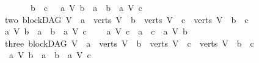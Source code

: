 \begin{isabellebody}
\ \ \ \ \ \ \ \ \ b\ {\isasymnoteq}\ c\ \ {\isasymand}\ {\isacharparenleft}{\kern0pt}{\isacharparenleft}{\kern0pt}{\isacharparenleft}{\kern0pt}a\ {\isasymrightarrow}\isactrlsup {\isacharplus}{\kern0pt}\isactrlbsub V\isactrlesub \ b{\isacharparenright}{\kern0pt}\ {\isasymor}\ a\ {\isacharequal}{\kern0pt}\ b{\isacharparenright}{\kern0pt}\ {\isasymand}\ {\isasymnot}{\isacharparenleft}{\kern0pt}a\ {\isasymrightarrow}\isactrlsup {\isacharplus}{\kern0pt}\isactrlbsub V\isactrlesub \ c{\isacharparenright}{\kern0pt}{\isacharparenright}{\kern0pt}{\isachardoublequoteclose}\ \isanewline
\ \ {\isacharbar}{\kern0pt}\ {\isacharparenleft}{\kern0pt}two{\isacharparenright}{\kern0pt}\ {\isachardoublequoteopen}{\isacharparenleft}{\kern0pt}blockDAG\ V\ {\isasymand}\ a\ {\isasymin}\ verts\ V\ {\isasymand}\ b\ {\isasymin}\ verts\ V\ {\isasymand}\ c\ {\isasymin}\ verts\ V{\isacharparenright}{\kern0pt}\ {\isasymand}\ b\ {\isasymnoteq}\ c\ \isanewline
\ \ {\isasymand}\ {\isasymnot}{\isacharparenleft}{\kern0pt}{\isacharparenleft}{\kern0pt}{\isacharparenleft}{\kern0pt}a\ {\isasymrightarrow}\isactrlsup {\isacharplus}{\kern0pt}\isactrlbsub V\isactrlesub \ b{\isacharparenright}{\kern0pt}\ {\isasymor}\ a\ {\isacharequal}{\kern0pt}\ b{\isacharparenright}{\kern0pt}\ {\isasymand}\ {\isasymnot}{\isacharparenleft}{\kern0pt}a\ {\isasymrightarrow}\isactrlsup {\isacharplus}{\kern0pt}\isactrlbsub V\isactrlesub \ c{\isacharparenright}{\kern0pt}{\isacharparenright}{\kern0pt}\ {\isasymand}\ \isanewline
\ \ {\isacharparenleft}{\kern0pt}{\isacharparenleft}{\kern0pt}a\ {\isasymrightarrow}\isactrlsup {\isacharplus}{\kern0pt}\isactrlbsub V\isactrlesub \ c{\isacharparenright}{\kern0pt}\ {\isasymor}\ a\ {\isacharequal}{\kern0pt}\ c{\isacharparenright}{\kern0pt}\ {\isasymand}\ {\isasymnot}{\isacharparenleft}{\kern0pt}a\ {\isasymrightarrow}\isactrlsup {\isacharplus}{\kern0pt}\isactrlbsub V\isactrlesub \ b{\isacharparenright}{\kern0pt}{\isachardoublequoteclose}\isanewline
\ \ {\isacharbar}{\kern0pt}\ {\isacharparenleft}{\kern0pt}three{\isacharparenright}{\kern0pt}\ {\isachardoublequoteopen}{\isacharparenleft}{\kern0pt}blockDAG\ V\ {\isasymand}\ a\ {\isasymin}\ verts\ V\ {\isasymand}\ b\ {\isasymin}\ verts\ V\ {\isasymand}\ c\ {\isasymin}\ verts\ V{\isacharparenright}{\kern0pt}\ {\isasymand}\ b\ {\isasymnoteq}\ c\ \isanewline
\ \ \ {\isasymand}\ {\isasymnot}{\isacharparenleft}{\kern0pt}{\isacharparenleft}{\kern0pt}{\isacharparenleft}{\kern0pt}a\ {\isasymrightarrow}\isactrlsup {\isacharplus}{\kern0pt}\isactrlbsub V\isactrlesub \ b{\isacharparenright}{\kern0pt}\ {\isasymor}\ a\ {\isacharequal}{\kern0pt}\ b{\isacharparenright}{\kern0pt}\ {\isasymand}\ {\isasymnot}{\isacharparenleft}{\kern0pt}a\ {\isasymrightarrow}\isactrlsup {\isacharplus}{\kern0pt}\isactrlbsub V\isactrlesub \ c{\isacharparenright}{\kern0pt}{\isacharparenright}{\kern0pt}\ {\isasymand}\ \ \isanewline

\end{isabellebody}

